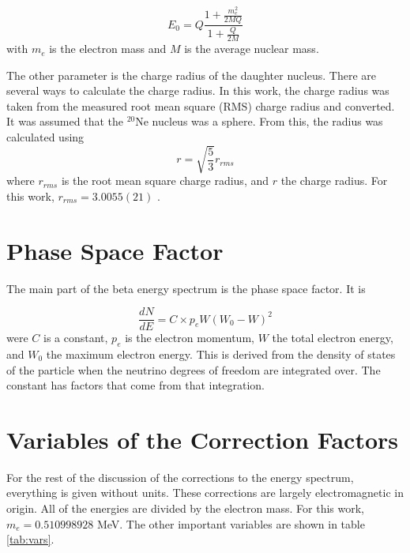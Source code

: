 \documentclass[../MaxHughesThesis.tex]{subfiles}
\begin{document}
\begin{equation}
	E_{0} = Q\frac{1 + \frac{m_{e}^{2}}{2MQ}}{1 + \frac{Q}{2M}} 
	\label{eq:recoilqval}
\end{equation} 
with $m_{e}$ is the electron mass and $M$ is the average nuclear mass. 

The other parameter is the charge radius of the daughter nucleus.
There are several ways to calculate the charge radius.
In this work, the charge radius was taken from the measured root mean square (RMS) charge radius and converted.
It was assumed that the $^{20}$Ne nucleus was a sphere. 
From this, the radius was calculated using %
\begin{equation}
	r = \sqrt{\frac{5}{3}}r_{rms}	
	\label{eq:sphereeq}
\end{equation}
where $r_{rms}$ is the root mean square charge radius, and $r$ the charge radius.
For this work, $r_{rms} = 3.0055 (21)$ \cite{Ang13}.

\section{Phase Space Factor}
The main part of the beta energy spectrum is the phase space factor.
It is %

\begin{equation}
	\frac{dN}{dE} = C \times p_{e}W(W_{0} - W)^{2}
	\label{eq:phase_space}
\end{equation}
were $C$ is a constant, $p_{e}$ is the electron momentum, $W$ the total electron energy, and $W_{0}$ the maximum electron energy.
This is derived from the density of states of the particle when the neutrino degrees of freedom are integrated over.
The constant has factors that come from that integration.

\section{Variables of the Correction Factors}

For the rest of the discussion of the corrections to the energy spectrum, everything is given without units.
These corrections are largely electromagnetic in origin.
All of the energies are divided by the electron mass.
For this work, $m_{e} = 0.510998928$ MeV.
The other important variables are shown in table \ref{tab:vars}.
\end{document}
